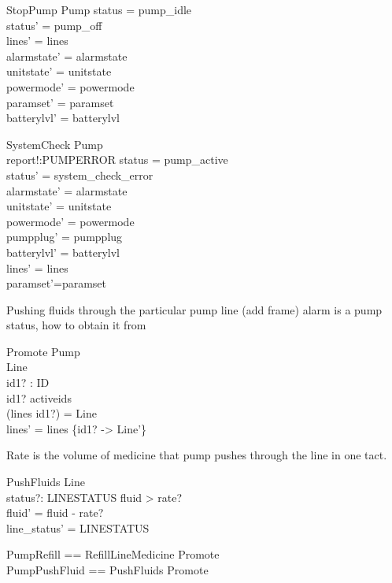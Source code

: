 \documentclass{article}
\begin{document}
		
	\begin{schema}{StopPump}
		\Delta Pump
	\where
		status = pump\_idle \\ 
		status' = pump\_off \\
		lines' = lines  \\
    	alarmstate' = alarmstate \\
    	unitstate' = unitstate \\
    	powermode' = powermode \\
		paramset' = paramset\\
		batterylvl' = batterylvl
	\end{schema}	
			
	
			
	\begin{schema}{SystemCheck}
		\Delta Pump\\
		
		report!:PUMPERROR
	\where 
		status = pump_active\\
		status' = system_check_error\\
	alarmstate' = alarmstate \\
	unitstate' = unitstate \\
	powermode' = powermode \\
	pumpplug' = pumpplug\\
	batterylvl' = batterylvl\\
	lines' = lines\\
	paramset'=paramset\\
	\end{schema}
	
	
	Pushing fluids through the particular pump line (add frame) alarm is a pump status, how to obtain it from
	
	\begin{schema}{Promote}
		\Delta Pump	\\
		\Delta Line \\
		id1? : ID \\
	\where 
		id1? \in activeids \\
		(lines id1?) = \theta Line \\
		lines' = lines \oplus \{id1? -> \theta Line'\} \\		
	\end{schema}
	
	Rate is the volume of medicine that pump pushes through the line in one tact.
	\begin{schema}{PushFluids}
		\Delta Line \\
		status?: LINESTATUS
	\where 
		fluid > rate? \\
		fluid' = fluid - rate? \\
		line_status' = LINESTATUS
	\end{schema}

\begin{zed}
	PumpRefill == RefillLineMedicine \land Promote\\
	PumpPushFluid == PushFluids \land Promote\\
\end{zed}
\end{document}
